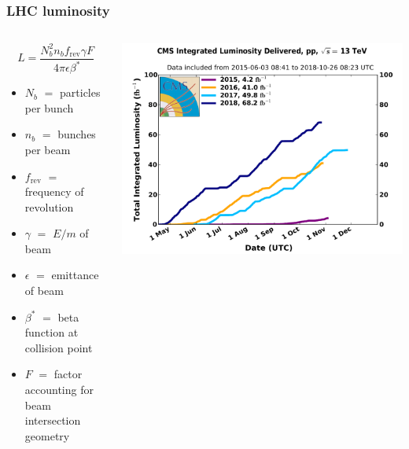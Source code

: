 \documentclass[aspectratio=169,xcolor=dvipsnames,,table,compress]{beamer}
\begin{document}
\begin{frame}\frametitle{LHC luminosity}
  \begin{columns}
    \begin{column}{0.6\textwidth}
      \[L = \frac{N_b^2 n_b f_\mathrm{rev} \gamma F}{4\pi\epsilon \beta^*}\]
      \begin{itemize}
          \item $N_b$ $=$ particles per bunch
          \item $n_b$ $=$ bunches per beam 
          \item $f_\mathrm{rev}$ $=$ frequency of revolution 
          \item $\gamma$ $=$ $E/m$ of beam 
          \item $\epsilon$ $=$ emittance of beam 
          \item $\beta^*$ $=$ beta function at collision point 
          \item $F$ $=$ factor accounting for beam intersection geometry
      \end{itemize}
    \end{column}
    \begin{column}{0.4\textwidth}
        \includegraphics[width=\textwidth]{../figures/cms/lumi.pdf}
    \end{column}
  \end{columns}
\end{frame}
\end{document}
